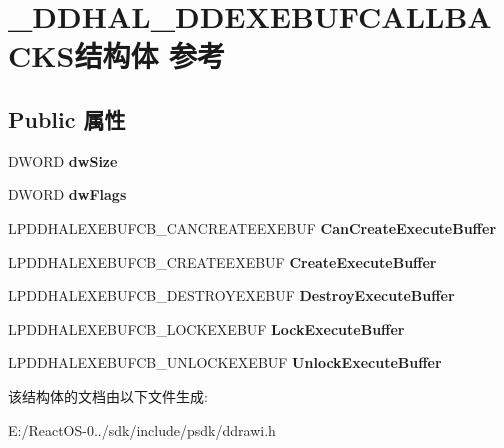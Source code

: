 \hypertarget{struct___d_d_h_a_l___d_d_e_x_e_b_u_f_c_a_l_l_b_a_c_k_s}{}\section{\+\_\+\+D\+D\+H\+A\+L\+\_\+\+D\+D\+E\+X\+E\+B\+U\+F\+C\+A\+L\+L\+B\+A\+C\+K\+S结构体 参考}
\label{struct___d_d_h_a_l___d_d_e_x_e_b_u_f_c_a_l_l_b_a_c_k_s}
\subsection*{Public 属性}
\begin{DoxyCompactItemize}
\item 
\mbox{\label{struct___d_d_h_a_l___d_d_e_x_e_b_u_f_c_a_l_l_b_a_c_k_s_a74bb6d43fe8d713db2e972f7230ec0a9}} 
D\+W\+O\+RD {\bfseries dw\+Size}
\item 
\mbox{\label{struct___d_d_h_a_l___d_d_e_x_e_b_u_f_c_a_l_l_b_a_c_k_s_a57e021c67a1c8b7bc1fd43c74b120233}} 
D\+W\+O\+RD {\bfseries dw\+Flags}
\item 
\mbox{\label{struct___d_d_h_a_l___d_d_e_x_e_b_u_f_c_a_l_l_b_a_c_k_s_a5e79053594f945d457577506b33850c9}} 
L\+P\+D\+D\+H\+A\+L\+E\+X\+E\+B\+U\+F\+C\+B\+\_\+\+C\+A\+N\+C\+R\+E\+A\+T\+E\+E\+X\+E\+B\+UF {\bfseries Can\+Create\+Execute\+Buffer}
\item 
\mbox{\label{struct___d_d_h_a_l___d_d_e_x_e_b_u_f_c_a_l_l_b_a_c_k_s_a16315c7522027f66469619eeef2a0448}} 
L\+P\+D\+D\+H\+A\+L\+E\+X\+E\+B\+U\+F\+C\+B\+\_\+\+C\+R\+E\+A\+T\+E\+E\+X\+E\+B\+UF {\bfseries Create\+Execute\+Buffer}
\item 
\mbox{\label{struct___d_d_h_a_l___d_d_e_x_e_b_u_f_c_a_l_l_b_a_c_k_s_ae316d231806f54c209299e62eacaaa5c}} 
L\+P\+D\+D\+H\+A\+L\+E\+X\+E\+B\+U\+F\+C\+B\+\_\+\+D\+E\+S\+T\+R\+O\+Y\+E\+X\+E\+B\+UF {\bfseries Destroy\+Execute\+Buffer}
\item 
\mbox{\label{struct___d_d_h_a_l___d_d_e_x_e_b_u_f_c_a_l_l_b_a_c_k_s_ada4f9ab9d0d7b82ee7016fe685dbd751}} 
L\+P\+D\+D\+H\+A\+L\+E\+X\+E\+B\+U\+F\+C\+B\+\_\+\+L\+O\+C\+K\+E\+X\+E\+B\+UF {\bfseries Lock\+Execute\+Buffer}
\item 
\mbox{\label{struct___d_d_h_a_l___d_d_e_x_e_b_u_f_c_a_l_l_b_a_c_k_s_afbeae13b7cd2c629d46abae57b1be957}} 
L\+P\+D\+D\+H\+A\+L\+E\+X\+E\+B\+U\+F\+C\+B\+\_\+\+U\+N\+L\+O\+C\+K\+E\+X\+E\+B\+UF {\bfseries Unlock\+Execute\+Buffer}
\end{DoxyCompactItemize}


该结构体的文档由以下文件生成\+:\begin{DoxyCompactItemize}
\item 
E\+:/\+React\+O\+S-\/0../sdk/include/psdk/ddrawi.\+h\end{DoxyCompactItemize}
